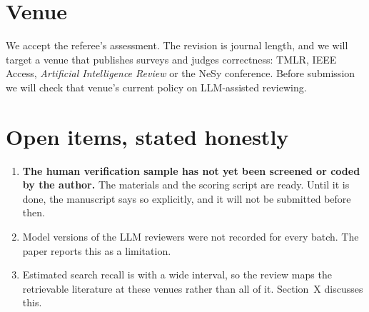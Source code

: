 \documentclass[10pt,a4paper]{article}
\begin{document}
\section*{Venue}
We accept the referee's assessment. The revision is journal length, and we will target a venue that publishes surveys and judges correctness: TMLR, IEEE Access, \emph{Artificial Intelligence Review} or the NeSy conference. Before submission we will check that venue's current policy on LLM-assisted reviewing.

\section*{Open items, stated honestly}
\begin{enumerate}
  \item \textbf{The human verification sample has not yet been screened or coded by the author.} The materials and the scoring script are ready. Until it is done, the manuscript says so explicitly, and it will not be submitted before then.
  \item Model versions of the LLM reviewers were not recorded for every batch. The paper reports this as a limitation.
  \item Estimated search recall is  with a wide interval, so the review maps the retrievable literature at these venues rather than all of it. Section~X discusses this.
\end{enumerate}
\end{document}
